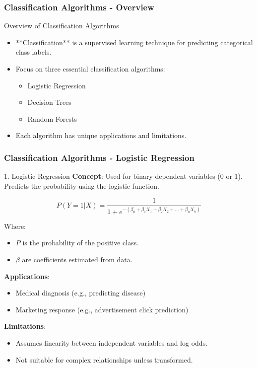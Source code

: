 \documentclass[aspectratio=169]{beamer}
\begin{document}
\begin{frame}[fragile]
    \frametitle{Classification Algorithms - Overview}
    \begin{block}{Overview of Classification Algorithms}
        \begin{itemize}
            \item **Classification** is a supervised learning technique for predicting categorical class labels.
            \item Focus on three essential classification algorithms:
            \begin{itemize}
                \item Logistic Regression
                \item Decision Trees
                \item Random Forests
            \end{itemize}
            \item Each algorithm has unique applications and limitations.
        \end{itemize}
    \end{block}
\end{frame}

\begin{frame}[fragile]
    \frametitle{Classification Algorithms - Logistic Regression}
    \begin{block}{1. Logistic Regression}
        \textbf{Concept}: Used for binary dependent variables (0 or 1). Predicts the probability using the logistic function.
        
        \begin{equation}
            P(Y=1 | X) = \frac{1}{1 + e^{-(\beta_0 + \beta_1X_1 + \beta_2X_2 + ... + \beta_nX_n)}}
        \end{equation}
        
        Where:
        \begin{itemize}
            \item \( P \) is the probability of the positive class.
            \item \( \beta \) are coefficients estimated from data.
        \end{itemize}
        
        \textbf{Applications}:
        \begin{itemize}
            \item Medical diagnosis (e.g., predicting disease)
            \item Marketing response (e.g., advertisement click prediction)
        \end{itemize}
        
        \textbf{Limitations}:
        \begin{itemize}
            \item Assumes linearity between independent variables and log odds.
            \item Not suitable for complex relationships unless transformed.
        \end{itemize}
    \end{block}
\end{frame}
\end{document}
